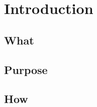 \chapter{Introduction}
\label{chapter:Introduction}



\section{What}
\section{Purpose}
\section{How}
 


